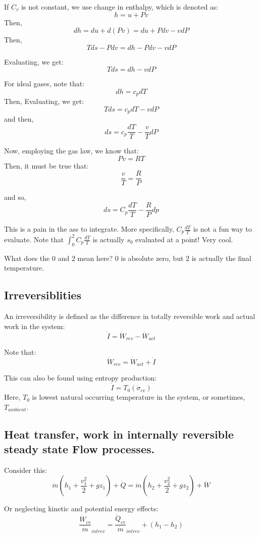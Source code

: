\documentclass{article}
\begin{document}
If  $C_v$ is not constant, we use change in enthalpy, which is denoted as:
\[h = u + Pv\]
Then, 
\[dh = du + d(Pv) = du + Pdv - vdP\]
Then, \[Tds - Pdv = dh - Pdv - vdP\]

Evaluating, we get:
\[Tds = dh - vdP\]

For ideal gases, note that:
\[dh = c_pdT\]
Then, 
Evaluating, we get:
\[Tds = c_pdT - vdP\]
and then,
\[ds = c_p\frac{dT}{T} - \frac{v}{T}dP\]

Now, employing the gas law, we know that:
\[Pv = RT\]
Then, it must be true that:
\[\frac{v}{T} = \frac{R}{P}\]

and so,
\[ds = C_p \frac{dT}{T} - \frac{R}{P}dp\]

This is a pain in the ass to integrate. More specifically, $C_p \frac{dT}{T}$ is not a fun way to evaluate. Note that $\int_0^2 C_p \frac{dT}{T}$ is actually $s_0$ evaluated at a point! Very cool. 

\begin{proposition}
    What does the $0$ and $2$ mean here? $0$ is absolute zero, but $2$ is actually the final temperature.
\end{proposition}

\subsection{Irreversiblities}
\begin{definition}
    An irreversibility is defined as the difference in totally reversible work and actual work in the system:
    \[\dot I = \dot W_{rev} - \dot W_{act}\]
\end{definition}
Note that:
\[\dot W_{rev} = \dot W_{act} + \dot {I}\]

This can also be found using entropy production:
\[\dot I = T_0(\dot \sigma_{cv})\]
Here, $T_0$ is lowest natural occurring temperature in the system, or sometimes, $T_{ambient}$. 

\subsection{Heat transfer, work in internally reversible steady state Flow processes. }
Consider this:
\[\dot{m} \left( h_1 + \frac{v_1^2}{2} + gz_1 \right) + \dot{Q} = \dot{m} \left( h_2 + \frac{v_2^2}{2} + gz_2 \right) + \dot{W}
\]

Or neglecting kinetic and potential energy effects:
\[\frac{\dot W_{cv}}{\dot m}_{int rev} = \frac{\dot Q_{cv}}{\dot m}_{int rev} + (h_1 - h_2)\]
\end{document}

